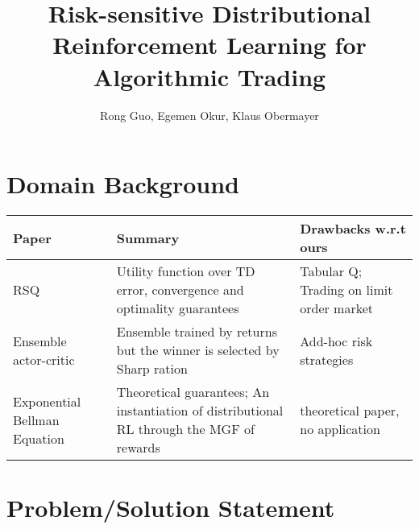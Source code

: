 

\title{Risk-sensitive Distributional Reinforcement Learning for Algorithmic Trading}
\author{Rong Guo, Egemen Okur, Klaus Obermayer}



\maketitle

\listoftodos

\section{Domain Background}

\begin{center}
\begin{longtable}{| m{4cm} | m{5cm} | m{5cm} | }
\hline
\textbf{Paper} & \textbf{Summary} & \textbf{Drawbacks w.r.t ours}\\
\hline
\hline
RSQ \citep{shen_risk-sensitive_2014, shen_risk-averse_2014} & Utility function over TD error, convergence and optimality guarantees & Tabular Q; Trading on limit order market \\
\hline
Ensemble actor-critic \citep{yang_deep_2020} & Ensemble trained by returns but the winner is selected by Sharp ration & Add-hoc risk strategies\\
\hline
Exponential Bellman Equation \citep{fei_exponential_nodate} & Theoretical guarantees; An instantiation of distributional RL through the MGF of rewards & theoretical paper, no application \\
\hline
\end{longtable}
\end{center}


\section{Problem/Solution Statement}

~\\
~\\

